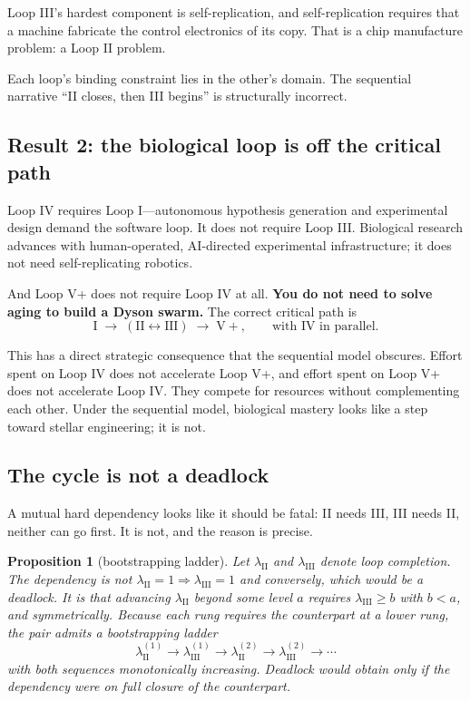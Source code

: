 \documentclass[11pt]{article}
\newtheorem{proposition}{Proposition}
\begin{document}
Loop III's hardest component is self-replication, and self-replication requires that a machine fabricate the control electronics of its copy. That is a chip manufacture problem: a Loop II problem.

Each loop's binding constraint lies in the other's domain. The sequential narrative ``II closes, then III begins'' is structurally incorrect.

\subsection{Result 2: the biological loop is off the critical path}
\label{sec:iv-parallel}

Loop IV requires Loop I---autonomous hypothesis generation and experimental design demand the software loop. It does not require Loop III. Biological research advances with human-operated, AI-directed experimental infrastructure; it does not need self-replicating robotics.

And Loop V+ does not require Loop IV at all. \textbf{You do not need to solve aging to build a Dyson swarm.} The correct critical path is
\[
\mathrm{I} \;\longrightarrow\; (\mathrm{II} \leftrightarrow \mathrm{III}) \;\longrightarrow\; \mathrm{V+}, \qquad \text{with IV in parallel.}
\]

This has a direct strategic consequence that the sequential model obscures. Effort spent on Loop IV does not accelerate Loop V+, and effort spent on Loop V+ does not accelerate Loop IV. They compete for resources without complementing each other. Under the sequential model, biological mastery looks like a step toward stellar engineering; it is not.

\subsection{The cycle is not a deadlock}

A mutual hard dependency looks like it should be fatal: II needs III, III needs II, neither can go first. It is not, and the reason is precise.

\begin{proposition}[bootstrapping ladder]
\label{prop:bootstrap}
Let $\lambda_{\mathrm{II}}$ and $\lambda_{\mathrm{III}}$ denote loop completion. The dependency is not $\lambda_{\mathrm{II}} = 1 \Rightarrow \lambda_{\mathrm{III}} = 1$ and conversely, which would be a deadlock. It is that advancing $\lambda_{\mathrm{II}}$ beyond some level $a$ requires $\lambda_{\mathrm{III}} \geq b$ with $b < a$, and symmetrically. Because each rung requires the counterpart at a \emph{lower} rung, the pair admits a bootstrapping ladder
\[
\lambda_{\mathrm{II}}^{(1)} \to \lambda_{\mathrm{III}}^{(1)} \to \lambda_{\mathrm{II}}^{(2)} \to \lambda_{\mathrm{III}}^{(2)} \to \cdots
\]
with both sequences monotonically increasing. Deadlock would obtain only if the dependency were on full closure of the counterpart.
\end{proposition}
\end{document}
